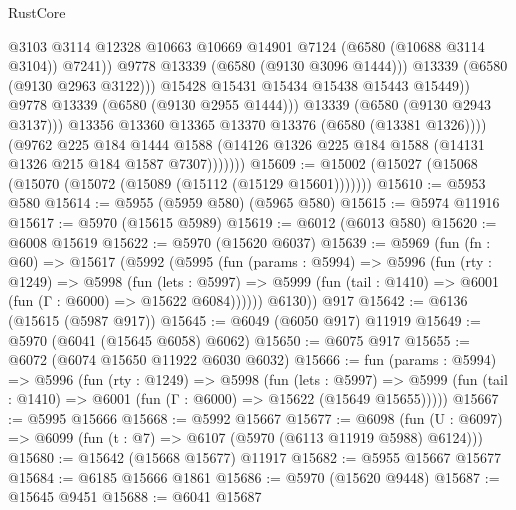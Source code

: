 \begin{lexlean}{RustCore}
\begin{coremodule}
{\begin{coremodule}
{{{{{{{{{{{{{{{{{{{{{{{{{{{{{{{{{{{{{{{{{{{{{                                @3103
                                @3114
                                @12328
                                @10663
                                @10669
                                @14901
                                @7124
                                (@6580 (@10688 @3114 @3104))
                                @7241))
                            @9778
                            @13339
                            (@6580 (@9130 @3096 @1444)))
                          @13339
                          (@6580 (@9130 @2963 @3122)))
                        @15428
                        @15431
                        @15434
                        @15438
                        @15443
                        @15449))
                    @9778
                    @13339
                    (@6580 (@9130 @2955 @1444)))
                  @13339
                  (@6580 (@9130 @2943 @3137)))
                @13356
                @13360
                @13365
                @13370
                @13376
                (@6580 (@13381 @1326))))
            (@9762
              @225
              @184
              @1444
              @1588
              (@14126 @1326 @225 @184 @1588 (@14131 @1326 @215 @184 @1587 @7307)))))))
@15609 := @15002 (@15027 (@15068 (@15070 (@15072 (@15089 (@15112 (@15129 @15601)))))))
@15610 := @5953 @580
@15614 := @5955 (@5959 @580) (@5965 @580)
@15615 := @5974 @11916
@15617 := @5970 (@15615 @5989)
@15619 := @6012 (@6013 @580)
@15620 := @6008 @15619
@15622 := @5970 (@15620 @6037)
@15639 := @5969
    (fun (fn : @60) =>
    @15617
      (@5992
        (@5995
          (fun (params : @5994) =>
          @5996
            (fun (rty : @1249) =>
            @5998
              (fun (lets : @5997) =>
              @5999 (fun (tail : @1410) => @6001 (fun (Γ : @6000) => @15622 @6084))))))
        @6130))
    @917
@15642 := @6136 (@15615 (@5987 @917))
@15645 := @6049 (@6050 @917) @11919
@15649 := @5970 (@6041 (@15645 @6058) @6062)
@15650 := @6075 @917
@15655 := @6072 (@6074 @15650 @11922 @6030 @6032)
@15666 := fun (params : @5994) =>
  @5996
    (fun (rty : @1249) =>
    @5998
      (fun (lets : @5997) =>
      @5999 (fun (tail : @1410) => @6001 (fun (Γ : @6000) => @15622 (@15649 @15655)))))
@15667 := @5995 @15666
@15668 := @5992 @15667
@15677 := @6098
    (fun (U : @6097) => @6099 (fun (t : @7) => @6107 (@5970 (@6113 @11919 @5988) @6124)))
@15680 := @15642 (@15668 @15677) @11917
@15682 := @5955 @15667 @15677
@15684 := @6185 @15666 @1861
@15686 := @5970 (@15620 @9448)
@15687 := @15645 @9451
@15688 := @6041 @15687
}}}}}}}}}}}}}}}}}}}}}}}}}}}}}}}}}}}}}}}}}}}}}
\end{coremodule}}
\end{coremodule}
\end{lexlean}
